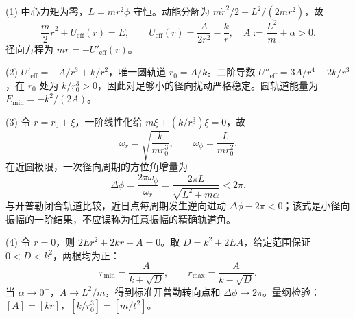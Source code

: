 (1) 中心力矩为零，\(L=mr^2\dot\phi\) 守恒。动能分解为 \(m\dot r^2/2+L^2/(2mr^2)\)，故
\[
\frac m2\dot r^2+U_{\mathrm{eff}}(r)=E,\qquad U_{\mathrm{eff}}(r)=\frac{A}{2r^2}-\frac{k}{r},\quad A:=\frac{L^2}{m}+\alpha>0.
\]
径向方程为 \(m\ddot r=-U'_{\mathrm{eff}}(r)\)。

(2) \(U'_{\mathrm{eff}}=-A/r^3+k/r^2\)，唯一圆轨道 \(r_0=A/k\)。二阶导数 \(U''_{\mathrm{eff}}=3A/r^4-2k/r^3\)，在 \(r_0\) 处为 \(k/r_0^3>0\)，因此对足够小的径向扰动严格稳定。圆轨道能量为 \(E_{\min}=-k^2/(2A)\)。

(3) 令 \(r=r_0+\xi\)，一阶线性化给 \(m\ddot\xi+(k/r_0^3)\xi=0\)，故
\[
\omega_r=\sqrt{\frac{k}{mr_0^3}},\qquad \omega_\phi=\frac{L}{mr_0^2}.
\]
在近圆极限，一次径向周期的方位角增量为
\[
\Delta\phi=\frac{2\pi\omega_\phi}{\omega_r}=\frac{2\pi L}{\sqrt{L^2+m\alpha}}<2\pi .
\]
与开普勒闭合轨道比较，近日点每周期发生逆向进动 \(\Delta\phi-2\pi<0\)；该式是小径向振幅的一阶结果，不应误称为任意振幅的精确轨道角。

(4) 令 \(\dot r=0\)，则 \(2Er^2+2kr-A=0\)。取 \(D=k^2+2EA\)，给定范围保证 \(0<D<k^2\)，两根均为正：
\[
r_{\min}=\frac{A}{k+\sqrt{D}},\qquad r_{\max}=\frac{A}{k-\sqrt{D}}.
\]
当 \(\alpha\to0^+\)，\(A\to L^2/m\)，得到标准开普勒转向点和 \(\Delta\phi\to2\pi\)。量纲检验：\([A]=[\!kr]\)，\([k/r_0^3]=[\!m/t^2]\)。
